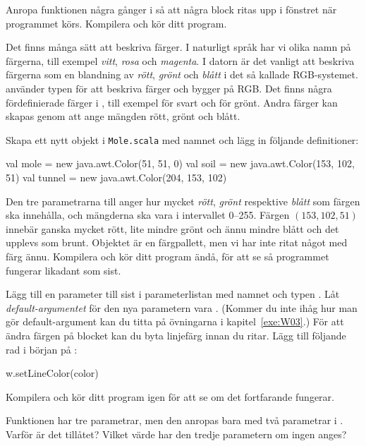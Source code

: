 \Subtask
Anropa funktionen  några gånger i  så att några block ritas upp i fönstret när programmet körs.
Kompilera och kör ditt program.


\Task
Det finns många sätt att beskriva färger.
I naturligt språk har vi olika namn på färgerna, till exempel \emph{vitt}, \emph{rosa} och \emph{magenta}.
I datorn är det vanligt att beskriva färgerna som en blandning av \emph{rött}, \emph{grönt} och \emph{blått} i det så kallade RGB-systemet.
 använder typen  för att beskriva färger och  bygger på RGB.
Det finns några fördefinierade färger i , till exempel  för svart och  för grönt.
Andra färger kan skapas genom att ange mängden rött, grönt och blått.

\Subtask
Skapa ett nytt objekt i \texttt{Mole.scala} med namnet  och lägg in följande definitioner:
\begin{Code}
val mole = new java.awt.Color(51, 51, 0)
val soil = new java.awt.Color(153, 102, 51)
val tunnel = new java.awt.Color(204, 153, 102)
\end{Code}
Den tre parametrarna till  anger hur mycket \emph{rött}, \emph{grönt} respektive \emph{blått} som färgen ska innehålla, och mängderna ska vara i intervallet 0--255.
Färgen $(153, 102, 51)$ innebär ganska mycket rött, lite mindre grönt och ännu mindre blått och det upplevs som brunt.
Objektet  är en färgpallett, men vi har inte ritat något med färg ännu.
Kompilera och kör ditt program ändå, för att se så programmet fungerar likadant som sist.

\Subtask
Lägg till en parameter till  sist i parameterlistan med namnet  och typen .
Låt \emph{default-argumentet} för den nya parametern vara .
(Kommer du inte ihåg hur man gör default-argument kan du titta på övningarna i kapitel~\ref{exe:W03}.)
För att ändra färgen på blocket kan du byta linjefärg innan du ritar.
Lägg till följande rad i början på :
\begin{Code}
w.setLineColor(color)
\end{Code}
Kompilera och kör ditt program igen för att se om det fortfarande fungerar.

\Subtask\Pen
Funktionen  har tre parametrar, men den anropas bara med två parametrar i .
Varför är det tillåtet?
Vilket värde har den tredje parametern om ingen anges?


